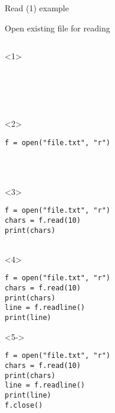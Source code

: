 \begin{frame}[fragile]{Read (1) example}

  Open existing file for reading

  \begin{columns}[onlytextwidth]
    \begin{column}{\textwidth}

      \begin{onlyenv}<1>
        \begin{lstlisting}[style=python]





 \end{lstlisting}
      \end{onlyenv}

      \begin{onlyenv}<2>
        \begin{lstlisting}[style=python]
f = open("file.txt", "r")




 \end{lstlisting}
      \end{onlyenv}

      \begin{onlyenv}<3>
        \begin{lstlisting}[style=python]
f = open("file.txt", "r")
chars = f.read(10)
print(chars)


 \end{lstlisting}
      \end{onlyenv}

      \begin{onlyenv}<4>
        \begin{lstlisting}[style=python]
f = open("file.txt", "r")
chars = f.read(10)
print(chars)
line = f.readline()
print(line)
 \end{lstlisting}
      \end{onlyenv}

      \begin{onlyenv}<5->
        \begin{lstlisting}[style=python]
f = open("file.txt", "r")
chars = f.read(10)
print(chars)
line = f.readline()
print(line)
f.close() \end{lstlisting}
      \end{onlyenv}

    \end{column}
  \end{columns}

\end{frame}

